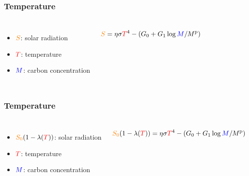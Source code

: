 \documentclass[pdf]{beamer}
\begin{document}
\begin{frame} \frametitle{Temperature}
    \begin{columns}
        \begin{itemize}
            \item ${\color{orange} S}$: solar radiation
            \item ${\color{red} T}$: temperature
            \item ${\color{blue} M}$: carbon concentration
        \end{itemize}
        \begin{equation*}
            {\color{orange} S} = \eta \sigma {\color{red} T}^4 - (G_0 + G_1 \log {\color{blue} M} / M^{\mathrm{p}})
        \end{equation*}
    \end{columns}
\end{frame}

\begin{frame} \frametitle{Temperature}
    \begin{columns}
        \begin{itemize}
            \item ${\color{orange} S_0} (1 - \lambda({\color{red} T}))$: solar radiation
            \item ${\color{red} T}$: temperature
            \item ${\color{blue} M}$: carbon concentration
        \end{itemize}
        \begin{equation*}
            {\color{orange} S_0} (1 - \lambda({\color{red} T})) = \eta \sigma {\color{red} T}^4 - (G_0 + G_1 \log {\color{blue} M} / M^{\mathrm{p}})
        \end{equation*}
    \end{columns}
\end{frame}
\end{document}
